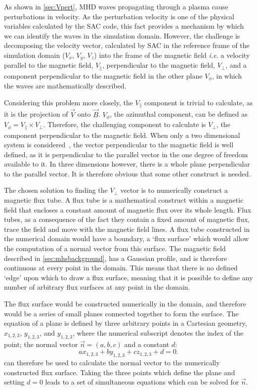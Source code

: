 As shown in \cref{sec:Vpert}, MHD waves propagating through a plasma cause perturbations in velocity.
As the perturbation velocity is one of the physical variables calculated by the SAC code, this fact provides a mechanism by which we can identify the waves in the simulation domain.
However, the challenge is decomposing the velocity vector, calculated by SAC in the reference frame of the simulation domain ($V_x$, $V_y$, $V_z$) into the frame of the magnetic field \textit{i.e.} a velocity parallel to the magnetic field, $V_\parallel$, perpendicular to the magnetic field, $V_\perp$, and a component perpendicular to the magnetic field in the other plane $V_\phi$, in which the waves are mathematically described.

Considering this problem more closely, the $V_\parallel$ component is trivial to calculate, as it is the projection of $\vec{V}$ onto $\vec{B}$.
$V_\phi$, the azimuthal component, can be defined as $V_\phi = V_\parallel \times V_\perp$.
Therefore, the challenging component to calculate is $V_\perp$, the component perpendicular to the magnetic field.
When only a two dimensional system is considered~\citep[e.g.][]{bogdan2003,fedun2011,shelyag2012}, the vector perpendicular to the magnetic field is well defined, as it is perpendicular to the parallel vector in the one degree of freedom available to it.
In three dimensions however, there is a whole plane perpendicular to the parallel vector.
It is therefore obvious that some other construct is needed.

The chosen solution to finding the $V_\perp$ vector is to numerically construct a magnetic flux tube.
A flux tube is a mathematical construct within a magnetic field that encloses a constant amount of magnetic flux over its whole length.
Flux tubes, as a consequence of the fact they contain a fixed amount of magnetic flux, trace the field and move with the magnetic field lines.
A flux tube constructed in the numerical domain would have a boundary, a `flux surface' which would allow the computation of a normal vector from this surface.
The magnetic field described in \cref{sec:mhsbackground}, has a Gaussian profile, and is therefore continuous at every point in the domain.
This means that there is no defined `edge' upon which to draw a flux surface, meaning that it is possible to define any number of arbitrary flux surfaces at any point in the domain.



The flux surface would be constructed numerically in the domain, and therefore would be a series of small planes connected together to form the surface.
The equation of a plane is defined by three arbitrary points in a Cartesian geometry, $x_{1,2,3}$, $y_{1,2,3}$, and $y_{1,2,3}$, where the numerical subscript denotes the index of the point; the normal vector $\vec{n}=(a,b,c)$ and a constant $d$:
\begin{equation}
    ax_{1,2,3}+by_{1,2,3}+cz_{1,2,3}+d=0.
    \label{eq:plane}
\end{equation}
 can therefore be used to calculate the normal vector to the numerically constructed flux surface.
Taking the three points which define the plane and setting $d=0$ leads to a set of simultaneous equations which can be solved for $\vec{n}$.

